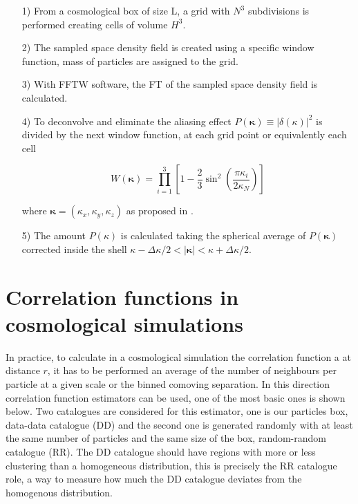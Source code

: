 \begin{enumerate}

\item[1)] From a cosmological box of size L, a grid with $N^3$ subdivisions is performed
creating cells of volume $H^3$. 

\item[2)] The sampled space density field is created using a specific window function,
mass of particles are assigned to the grid. 

\item[3)] With FFTW software, the FT of the sampled space density field is calculated.

\item[4)] To deconvolve and eliminate the aliasing effect $P(\boldsymbol{\kappa})\equiv |\delta(\kappa)|^2$ is divided by the next window function, at each grid point or equivalently each cell

\[ W(\boldsymbol{\kappa}) = \prod^{3}_{i=1}\left[ 1 - \frac{2}{3}\sin^2\left(\frac{\pi\kappa_i}{2\kappa_N}\right) \right] \]

where $\boldsymbol{\kappa} = (\kappa_x,\kappa_y,\kappa_z)$ as proposed in \cite{Jeong}.  

\item[5)] The amount $P(\kappa)$ is calculated taking the spherical average of 
$P(\boldsymbol{\kappa})$ corrected inside the shell 
$\kappa -\Delta\kappa/2	< |\boldsymbol{\kappa}|<\kappa +\Delta\kappa/2$.

\end{enumerate}


\section{ Correlation functions in cosmological simulations }


In practice, to calculate in a cosmological simulation the correlation function 
a at distance $r$, it has to be performed an average of the number of neighbours per 
particle at a given scale or the binned comoving separation. In this direction 
correlation function estimators can be used, one of the most basic ones is shown below. 
Two catalogues are considered for this estimator, one is our particles box, 
data-data catalogue (DD) and the second one is generated 
randomly with at least the same number of particles and the same size of the box, 
random-random catalogue (RR). The DD catalogue should have regions with more or
less clustering than a homogeneous distribution, this is precisely the RR catalogue role, 
a way to measure how much the DD catalogue deviates from the homogenous distribution. 

